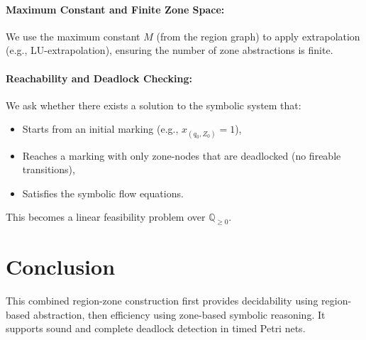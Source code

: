 \documentclass{article}
\begin{document}
\paragraph{Maximum Constant and Finite Zone Space:}
We use the maximum constant $M$ (from the region graph) to apply extrapolation (e.g., LU-extrapolation), ensuring the number of zone abstractions is finite.

\paragraph{Reachability and Deadlock Checking:}
We ask whether there exists a solution to the symbolic system that:
\begin{itemize}[noitemsep]
  \item Starts from an initial marking (e.g., $x_{(q_0,Z_0)} = 1$),
  \item Reaches a marking with only zone-nodes that are deadlocked (no fireable transitions),
  \item Satisfies the symbolic flow equations.
\end{itemize}
This becomes a linear feasibility problem over $\mathbb{Q}_{\geq 0}$.

\section*{Conclusion}

This combined region-zone construction first provides decidability using region-based abstraction, then efficiency using zone-based symbolic reasoning. It supports sound and complete deadlock detection in timed Petri nets.
\end{document}
